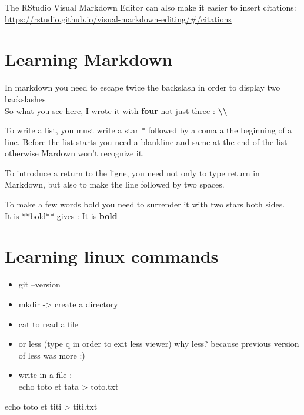 \documentclass[
]{book}
\begin{document}
The RStudio Visual Markdown Editor can also make it easier to insert citations: \url{https://rstudio.github.io/visual-markdown-editing/\#/citations}

\hypertarget{learning-markdown}{%
\chapter{Learning Markdown}\label{learning-markdown}}

In markdown you need to escape twice the backslash in order to display two backslashes\\
So what you see here, I wrote it with \textbf{four} not just three : \textbf{\textbackslash\textbackslash{}}

To write a list, you must write a star * followed by a coma a the beginning of a line.
Before the list starts you need a blankline and same at the end of the list otherwise Mardown won't recognize it.

To introduce a return to the ligne, you need not only to type return in Markdown, but also to make the line followed by two spaces.

To make a few words bold you need to surrender it with two stars both sides.\\
It is **bold** gives : It is \textbf{bold}

\hypertarget{learning-linux-commands}{%
\chapter{Learning linux commands}\label{learning-linux-commands}}

\begin{itemize}
\item
  git --version
\item
  mkdir -\textgreater{} create a directory
\item
  cat to read a file
\item
  or less (type q in order to exit less viewer)
  why less? because previous version of less was more :)
\item
  write in a file :\\
  echo toto et tata \textgreater{} toto.txt
\end{itemize}

echo toto et titi \textgreater{} titi.txt
\end{document}
